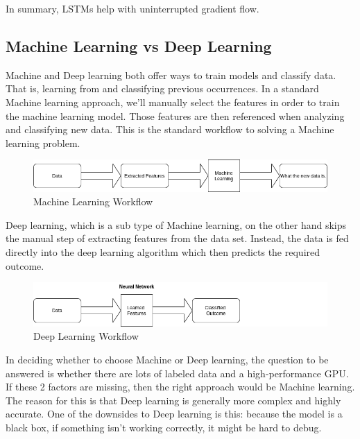 In summary, LSTMs help with uninterrupted gradient flow.

\subsection{Machine Learning vs Deep Learning}

Machine and Deep learning both offer ways to train models and classify data. That is, learning from and classifying previous occurrences. In a standard Machine learning approach, we'll manually select the features in order to train the machine learning model. Those features are then referenced when analyzing and classifying new data. This is the standard workflow to solving a Machine learning problem.

\begin{figure}[h!]
	\includegraphics[width=\textwidth,height=\textheight,keepaspectratio]{fig/mlwkflow.png}
	\caption{Machine Learning Workflow}
	\label{fig:ML}
\end{figure}




Deep learning, which is a sub type of Machine learning, on the other hand skips the manual step of extracting features from the data set. Instead, the data is fed directly into the deep learning algorithm which then predicts the required outcome. 

\begin{figure}[H]
	\includegraphics[width=\textwidth]{fig/dpwkflow.png}
	\caption{Deep Learning Workflow}	
	\label{fig:DL}
\end{figure}


In deciding whether to choose Machine or Deep learning, the question to be answered is whether there are lots of labeled data and a high-performance GPU. If these 2 factors are missing, then the right approach would be Machine learning. The reason for this is that Deep learning is generally more complex and highly accurate. One of the downsides to Deep learning is this: because the model is a black box, if something isn't working correctly, it might be hard to debug. 